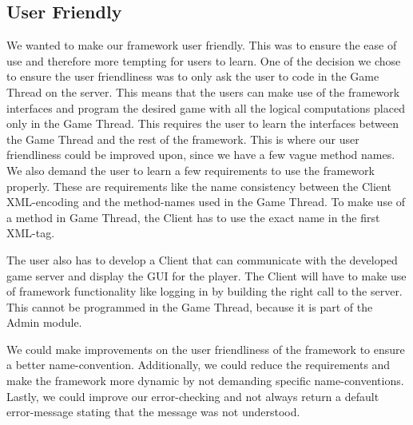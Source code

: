 \subsection{User Friendly}
We wanted to make our framework user friendly. This was to ensure the ease of use and therefore more tempting for users to learn. One of the decision we chose to ensure the user friendliness was to only ask the user to code in the Game Thread on the server. This means that the users can make use of the framework interfaces and program the desired game with all the logical computations placed only in the Game Thread. This requires the user to learn the interfaces between the Game Thread and the rest of the framework. This is where our user friendliness could be improved upon, since we have a few vague method names. We also demand the user to learn a few requirements to use the framework properly. These are requirements like the name consistency between the Client XML-encoding and the method-names used in the Game Thread. To make use of a method in Game Thread, the Client has to use the exact name in the first XML-tag. 

The user also has to develop a Client that can communicate with the developed game server and display the GUI for the player. The Client will have to make use of framework functionality like logging in by building the right call to the server. This cannot be programmed in the Game Thread, because it is part of the Admin module.  

We could make improvements on the user friendliness of the framework to ensure a better name-convention. Additionally, we could reduce the requirements and make the framework more dynamic by not demanding specific name-conventions. Lastly, we could improve our error-checking and not always return a default error-message stating that the message was not understood.
